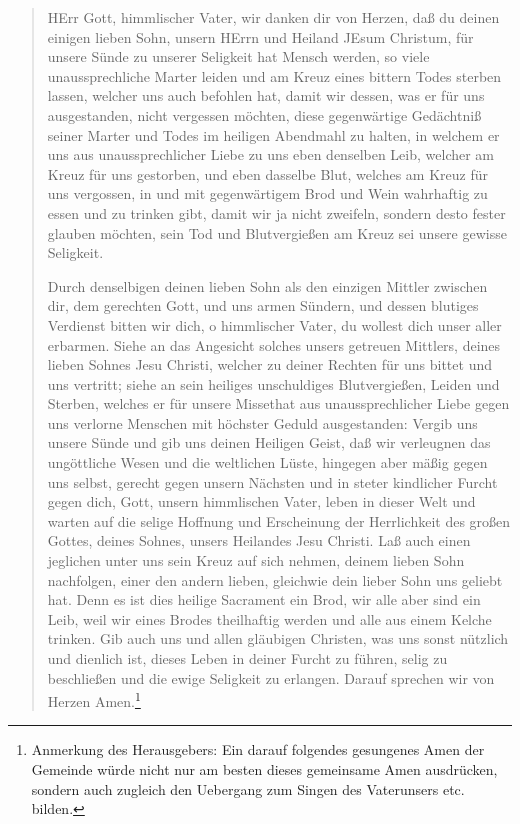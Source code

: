 \begin{quote}
HErr Gott, himmlischer Vater, wir danken dir von Herzen, daß du deinen einigen lieben Sohn, unsern HErrn und Heiland JEsum Christum, für unsere
Sünde zu unserer Seligkeit hat Mensch werden, so viele unaussprechliche Marter leiden und am Kreuz eines bittern Todes sterben lassen, welcher uns auch befohlen hat, damit wir dessen, was er für uns ausgestanden, nicht vergessen möchten, diese gegenwärtige Gedächtniß seiner Marter und Todes im heiligen Abendmahl zu halten, in welchem er uns aus unaussprechlicher Liebe zu uns eben denselben Leib, welcher am Kreuz für uns gestorben, und eben dasselbe Blut, welches am Kreuz für uns vergossen, in und mit gegenwärtigem Brod und Wein wahrhaftig zu essen und zu trinken gibt, damit wir ja nicht zweifeln, sondern desto fester glauben möchten, sein Tod und Blutvergießen am Kreuz sei unsere gewisse Seligkeit.

Durch denselbigen deinen lieben Sohn als den einzigen Mittler zwischen dir, dem gerechten Gott, und uns armen Sündern, und dessen blutiges Verdienst bitten wir dich, o himmlischer Vater, du wollest dich unser aller erbarmen. Siehe an das Angesicht solches unsers getreuen Mittlers, deines lieben Sohnes Jesu Christi, welcher zu deiner Rechten für uns bittet und uns vertritt; siehe an sein heiliges unschuldiges Blutvergießen, Leiden und Sterben, welches er für unsere Missethat aus unaussprechlicher Liebe gegen uns verlorne Menschen mit höchster Geduld ausgestanden: Vergib uns unsere Sünde und gib uns deinen Heiligen Geist, daß wir verleugnen das ungöttliche Wesen und die weltlichen Lüste, hingegen aber mäßig gegen uns selbst, gerecht gegen unsern Nächsten und in steter kindlicher Furcht gegen dich, Gott, unsern himmlischen Vater, leben in dieser Welt und warten auf die selige Hoffnung und Erscheinung der Herrlichkeit des großen Gottes, deines Sohnes, unsers Heilandes Jesu Christi. Laß auch einen jeglichen unter uns sein Kreuz auf sich nehmen, deinem lieben Sohn nachfolgen, einer den andern lieben, gleichwie dein lieber Sohn uns geliebt hat. Denn es ist dies heilige Sacrament ein Brod, wir alle aber sind ein Leib, weil wir eines Brodes theilhaftig werden und alle aus einem Kelche trinken. Gib auch uns und allen gläubigen Christen, was uns sonst nützlich und dienlich ist, dieses Leben in deiner Furcht zu führen, selig zu beschließen und die ewige Seligkeit zu erlangen. Darauf sprechen wir von Herzen Amen.\footnote{Anmerkung des Herausgebers: Ein darauf folgendes gesungenes Amen der Gemeinde würde nicht nur am besten dieses gemeinsame Amen ausdrücken, sondern auch zugleich den Uebergang zum Singen des Vaterunsers etc. bilden.}
\end{quote}

